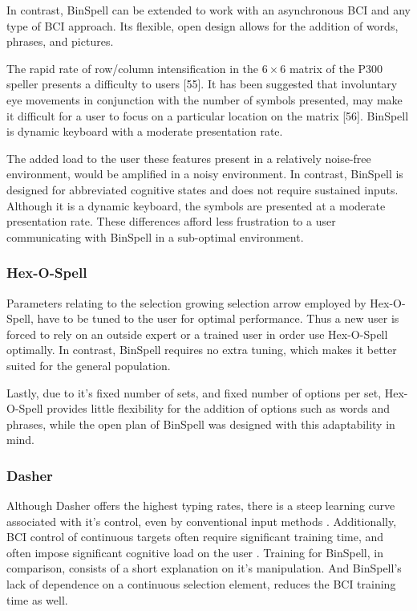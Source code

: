 \documentclass[12pt,titlepage]{article}
\begin{document}
In contrast, BinSpell can be extended to work with an asynchronous BCI and any type of BCI 
approach.  Its flexible, open design allows for the addition of words, phrases, and pictures.

The rapid rate of row/column intensification in the $6\times6$ matrix of the P300 speller presents a 
difficulty to users [55].  It has been suggested that involuntary eye movements in conjunction with 
the number of symbols presented, may make it difficult for a user to focus on a particular 
location on the matrix [56].  BinSpell is dynamic keyboard with a moderate presentation rate. 

The added load to the user these features present in a relatively noise-free environment, would 
be amplified in a noisy environment.  In contrast, BinSpell is designed for abbreviated 
cognitive states and does not require sustained inputs.  Although it is a dynamic keyboard, the 
symbols are presented at a moderate presentation rate.  These differences afford less frustration 
to a user communicating with BinSpell in a sub-optimal environment.

\subsubsection{Hex-O-Spell}

Parameters relating to the selection growing selection arrow employed by Hex-O-Spell, have to be tuned to the 
user for optimal performance.  Thus a new user is forced to rely on an outside expert or a 
trained user in order use Hex-O-Spell optimally.  In contrast, BinSpell requires no extra tuning, 
which makes it better suited for the general population. 

Lastly, due to it's fixed number of sets, and fixed number of options per set, Hex-O-Spell 
provides little flexibility for the addition of options such as words and phrases, while the open 
plan of BinSpell was designed with this adaptability in mind.

\subsubsection{Dasher}

Although Dasher offers the highest typing rates, there is a steep learning curve associated with 
it's control, even by conventional input methods \cite{felton2007neural}.  Additionally, BCI control of continuous 
targets often require significant training time, and often impose significant cognitive load on 
the user \cite{felton2007neural}.  Training for BinSpell, in comparison, consists of a short explanation on it's 
manipulation.  And BinSpell's lack of dependence on a continuous selection element, reduces 
the BCI training time as well.
\end{document}
